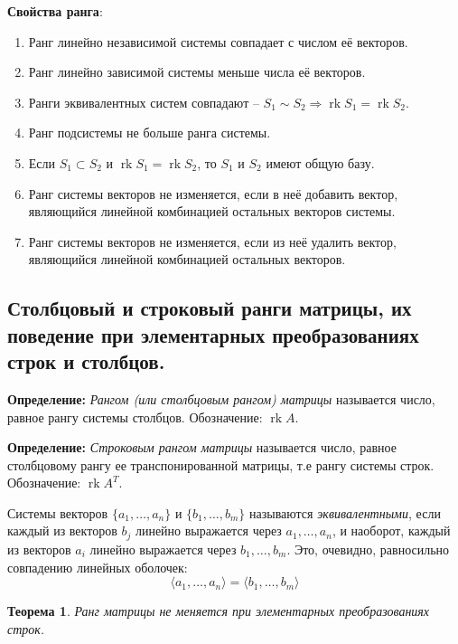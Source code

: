 \documentclass[a4paper, 12pt]{article}
\DeclareMathOperator{\rk}{rk}
\newtheorem*{que47theorem1}{Теорема}
\begin{document}
\textbf{Свойства ранга}:
\begin{enumerate}
\item Ранг линейно независимой системы совпадает с числом её векторов.
\item Ранг линейно зависимой системы меньше числа её векторов.
\item Ранги эквивалентных систем совпадают -- $S_{1}\sim S_{2}\Rightarrow \rk S_{1} = \rk S_{2}$.
\item Ранг подсистемы не больше ранга системы.
\item Если $S_{1}\subset S_{2}$ и $\rk S_{1}=\rk S_{2}$, то $S_{1}$ и $S_{2}$ имеют общую базу.
\item Ранг системы векторов не изменяется, если в неё добавить вектор, являющийся линейной комбинацией остальных векторов системы.
\item Ранг системы векторов не изменяется, если из неё удалить вектор, являющийся линейной комбинацией остальных векторов.
\end{enumerate}

\subsection{Столбцовый и строковый ранги матрицы, их поведение при элементарных преобразованиях строк и столбцов.}

\textbf{Определение:} \textit{Рангом (или столбцовым рангом) матрицы} называется число, равное рангу системы столбцов. Обозначение: $\rk A$.

\textbf{Определение:} \textit{Строковым рангом матрицы} называется число, равное столбцовому рангу ее транспонированной матрицы, т.е рангу системы строк. Обозначение: $\rk A^T$.

Системы векторов $\{a_1, \ldots, a_n\}$ и $\{b_1, \ldots, b_m\}$ называются \textit{эквивалентными}, если каждый из векторов $b_j$ линейно выражается через $a_1, \ldots, a_n$, и наоборот, каждый из векторов $a_i$ линейно выражается через $b_1, \ldots, b_m$. Это, очевидно, равносильно совпадению линейных оболочек:
$$
\langle a_1, \ldots, a_n \rangle = \langle b_1, \ldots, b_m \rangle 
$$

\begin{que47theorem1}
Ранг матрицы не меняется при элементарных преобразованиях строк.
\end{que47theorem1}
\end{document}
